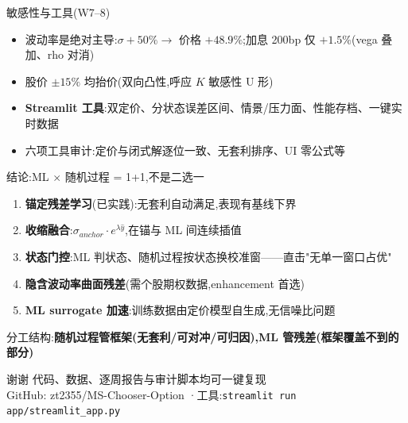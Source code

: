 \documentclass[aspectratio=169]{beamer}
\begin{document}
\begin{frame}{敏感性与工具(W7--8)}
\begin{itemize}
  \item 波动率是绝对主导:$\sigma+50\% \to$ 价格 $+48.9\%$;加息 200bp 仅 $+1.5\%$(vega 叠加、rho 对消)
  \item 股价 $\pm15\%$ 均抬价(双向凸性,呼应 $K$ 敏感性 U 形)
  \item \textbf{Streamlit 工具}:双定价、分状态误差区间、情景/压力面、性能存档、一键实时数据
  \item 六项工具审计:定价与闭式解逐位一致、无套利排序、UI 零公式等
\end{itemize}
\end{frame}

\begin{frame}{结论:ML $\times$ 随机过程 = 1+1,不是二选一}
\begin{enumerate}
  \item \textbf{锚定残差学习}(已实践):无套利自动满足,表现有基线下界
  \item \textbf{收缩融合}:$\sigma_{anchor}\cdot e^{\lambda\hat y}$,在锚与 ML 间连续插值
  \item \textbf{状态门控}:ML 判状态、随机过程按状态换校准窗——直击"无单一窗口占优"
  \item \textbf{隐含波动率曲面残差}(需个股期权数据,enhancement 首选)
  \item \textbf{ML surrogate 加速}:训练数据由定价模型自生成,无信噪比问题
\end{enumerate}
\vspace{4pt}
分工结构:\textbf{随机过程管框架(无套利/可对冲/可归因),ML 管残差(框架覆盖不到的部分)}
\end{frame}

\begin{frame}{谢谢}
\centering
\Large 代码、数据、逐周报告与审计脚本均可一键复现\\[8pt]
\normalsize GitHub: zt2355/MS-Chooser-Option \quad·\quad 工具:\texttt{streamlit run app/streamlit\_app.py}
\end{frame}
\end{document}
